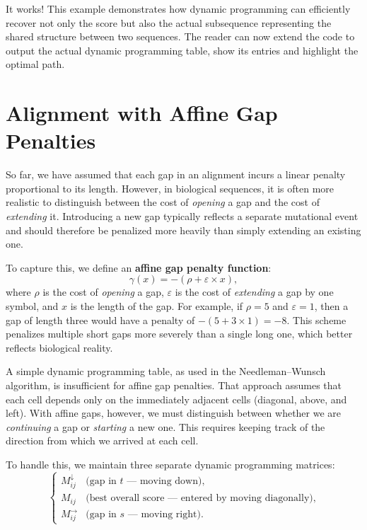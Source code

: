 It works! This example demonstrates how dynamic programming can efficiently recover not only the score but also the actual subsequence representing the shared structure between two sequences. The reader can now extend the code to output the actual dynamic programming table, show its entries and highlight the optimal path.

\section{Alignment with Affine Gap Penalties}

So far, we have assumed that each gap in an alignment incurs a linear penalty proportional to its length. 
However, in biological sequences, it is often more realistic to distinguish between the cost of \emph{opening} a gap 
and the cost of \emph{extending} it. Introducing a new gap typically reflects a separate mutational event and 
should therefore be penalized more heavily than simply extending an existing one. 

To capture this, we define an \textbf{affine gap penalty function}:
\[
\gamma(x) = -(\rho + \varepsilon \times x),
\]
where $\rho$ is the cost of \emph{opening} a gap, $\varepsilon$ is the cost of \emph{extending} a gap by one symbol, 
and $x$ is the length of the gap. For example, if $\rho = 5$ and $\varepsilon = 1$, then a gap of length three 
would have a penalty of $-(5 + 3\times1) = -8$. This scheme penalizes multiple short gaps more severely than 
a single long one, which better reflects biological reality.

A simple dynamic programming table, as used in the Needleman–Wunsch algorithm, is insufficient for affine gap penalties. 
That approach assumes that each cell depends only on the immediately adjacent cells (diagonal, above, and left). 
With affine gaps, however, we must distinguish between whether we are \emph{continuing} a gap or 
\emph{starting} a new one. This requires keeping track of the direction from which we arrived at each cell.

To handle this, we maintain three separate dynamic programming matrices:
\[
\begin{cases}
M_{ij}^\downarrow & \text{(gap in $t$ — moving down)},\\[4pt]
M_{ij} & \text{(best overall score — entered by moving diagonally)},\\[4pt]
M_{ij}^\rightarrow & \text{(gap in $s$ — moving right)}.
\end{cases}
\]

